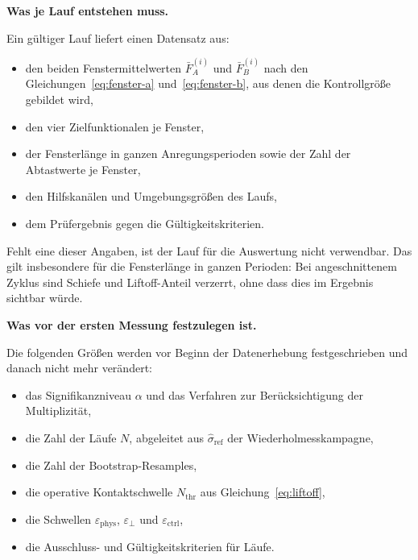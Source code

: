\documentclass[12pt,a4paper]{report}
\begin{document}
\vspace{0.5em}

\textbf{Was je Lauf entstehen muss.}

Ein gültiger Lauf liefert einen Datensatz aus:

\begin{itemize}
    \item den beiden Fenstermittelwerten $\bar{F}_{A}^{(i)}$ und
    $\bar{F}_{B}^{(i)}$ nach den Gleichungen~\eqref{eq:fenster-a}
    und~\eqref{eq:fenster-b}, aus denen die Kontrollgröße gebildet wird,
    \item den vier Zielfunktionalen je Fenster,
    \item der Fensterlänge in ganzen Anregungsperioden sowie der Zahl der
    Abtastwerte je Fenster,
    \item den Hilfskanälen und Umgebungsgrößen des Laufs,
    \item dem Prüfergebnis gegen die Gültigkeitskriterien.
\end{itemize}

Fehlt eine dieser Angaben, ist der Lauf für die Auswertung nicht
verwendbar. Das gilt insbesondere für die Fensterlänge in ganzen
Perioden: Bei angeschnittenem Zyklus sind Schiefe und Liftoff-Anteil
verzerrt, ohne dass dies im Ergebnis sichtbar würde.

\vspace{0.5em}

\textbf{Was vor der ersten Messung festzulegen ist.}

Die folgenden Größen werden vor Beginn der Datenerhebung festgeschrieben
und danach nicht mehr verändert:

\begin{itemize}
    \item das Signifikanzniveau $\alpha$ und das Verfahren zur
    Berücksichtigung der Multiplizität,
    \item die Zahl der Läufe $N$, abgeleitet aus
    $\hat{\sigma}_{\mathrm{ref}}$ der Wiederholmesskampagne,
    \item die Zahl der Bootstrap-Resamples,
    \item die operative Kontaktschwelle $N_{\mathrm{thr}}$ aus
    Gleichung~\eqref{eq:liftoff},
    \item die Schwellen $\varepsilon_{\mathrm{phys}}$,
    $\varepsilon_{\perp}$ und $\varepsilon_{\mathrm{ctrl}}$,
    \item die Ausschluss- und Gültigkeitskriterien für Läufe.
\end{itemize}
\end{document}
